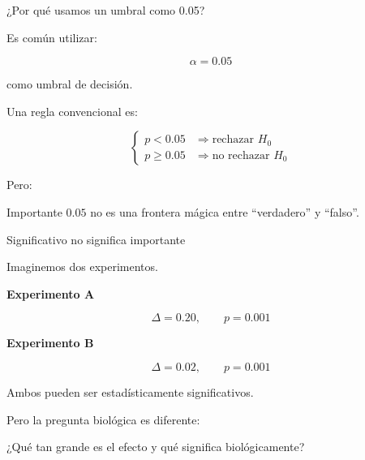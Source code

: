 \documentclass[11pt, aspectratio=169]{beamer}
\begin{document}
\begin{frame}{¿Por qué usamos un umbral como 0.05?}

Es común utilizar:

\vspace{-1em}

\[
\alpha=0.05
\]

como umbral de decisión.

\vspace{0.5cm}

Una regla convencional es:

\[
\begin{cases}
p < 0.05 &\Rightarrow \text{rechazar }H_0\\
p \geq 0.05 &\Rightarrow \text{no rechazar }H_0
\end{cases}
\]

Pero:

\begin{alertblock}{Importante}
$0.05$ no es una frontera mágica entre
``verdadero'' y ``falso''.
\end{alertblock}

\end{frame}

\begin{frame}{Significativo no significa importante}

Imaginemos dos experimentos.

\vspace{0.3cm}

\textbf{Experimento A}

\[
\Delta = 0.20,
\qquad p=0.001
\]

\textbf{Experimento B}

\[
\Delta = 0.02,
\qquad p=0.001
\]

\vspace{0.4cm}

Ambos pueden ser estadísticamente significativos.

Pero la pregunta biológica es diferente:

\begin{center}
\large
¿Qué tan grande es el efecto y qué significa biológicamente?
\end{center}

\end{frame}
\end{document}
